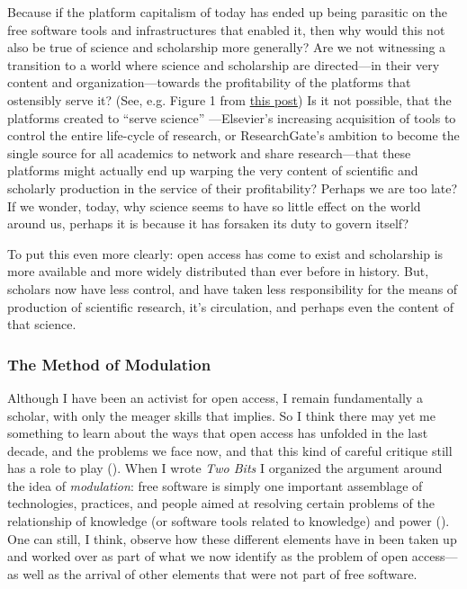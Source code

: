 \documentclass[11pt]{article}
\begin{document}
Because if the platform capitalism of today has ended up being parasitic on the free software tools and infrastructures that enabled it, then why would this not also be true of science and scholarship more generally?  Are we not witnessing a transition to a world where science and scholarship are directed---in their very content and organization---towards the profitability of the platforms that ostensibly serve it? (See, e.g. Figure 1 from \href{http://knowledgegap.org/index.php/sub-projects/rent-seeking-and-financialization-of-the-academic-publishing-industry/preliminary-findings/}{this post})  Is it not possible, that the platforms created to ``serve science'' ---Elsevier's increasing acquisition of tools to control the entire life-cycle of research, or ResearchGate's ambition to become the single source for all academics to network and share research---that these platforms might actually end up warping the very content of scientific and scholarly production in the service of their profitability?  Perhaps we are too late?  If we wonder, today, why science seems to have so little effect on the world around us, perhaps it is because it has forsaken its duty to govern itself?

To put this even more clearly: open access has come to exist and scholarship is more available and more widely distributed than ever before in history.  But, scholars now have less control, and have taken less responsibility for the means of production of scientific research, it's circulation, and perhaps even the content of that science.  

\subsubsection*{The Method of Modulation}
\label{sec:org1a7c888}

Although I have been an activist for open access, I remain fundamentally a scholar, with only the meager skills that implies.  So I think there may yet me something to learn about the ways that open access has unfolded in the last decade, and the problems we face now, and that this kind of careful critique still has a role to play (\cite{foucault1997critique,folkers2015darintrut}).  When I wrote \emph{Two Bits} I organized the argument around the idea of \emph{modulation}: free software is simply one important assemblage of technologies, practices, and people aimed at resolving certain problems of the relationship of knowledge (or software tools related to knowledge) and power (\cite{hacking2004histontol,rabinow2003anthtoday}).  One can still, I think, observe how these different elements have in been taken up and worked over as part of what we now identify as the problem of open access---as well as the arrival of other elements that were not part of free software. 
\end{document}
